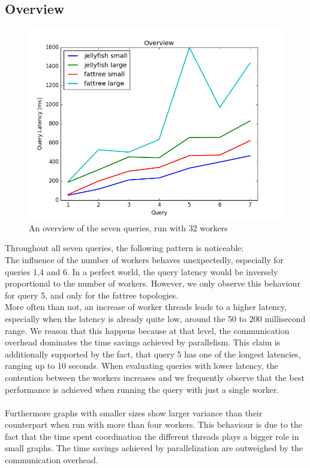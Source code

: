 \documentclass[11pt,singlecolumn]{scrartcl}
\begin{document}
\subsection{Overview}
\begin{figure}[H]
\includegraphics[width=1\textwidth]{ov}
\caption{An overview of the seven queries, run with 32 workers}
\end{figure}
Throughout all seven queries, the following pattern is noticeable:\\
The influence of the number of workers behaves unexpectedly, especially for queries 1,4 and 6. In a perfect world, the query latency would be inversely proportional to the number of workers. However, we only observe this behaviour for query 5, and only for the fattree topologies.\\More often than not, an increase of worker threads leads to a higher latency, especially when the latency is already quite low, around the 50 to 200 millisecond range. We reason that this happens because at that level, the communication overhead dominates the time savings achieved by parallelism. This claim is additionally supported by the fact, that query 5 has one of the longest latencies, ranging up to 10 seconds. When evaluating queries with lower latency, the contention between the workers increases and we frequently observe that the best performance is achieved when running the query with just a single worker.\\\\
Furthermore graphs with smaller sizes show larger variance than their counterpart when run with more than four workers. This behaviour is due to the fact that the time spent coordination the different threads plays a bigger role in small graphs. The time savings achieved by parallelization are outweighed by the communication overhead.\\\\
\end{document}
